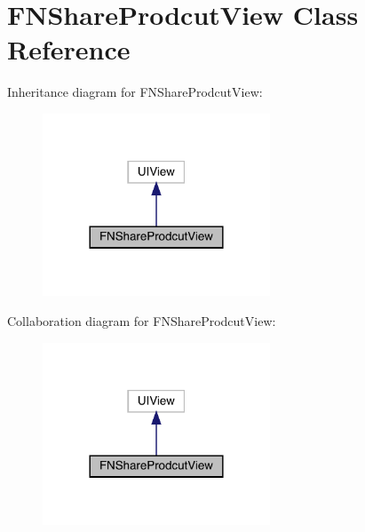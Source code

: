 \hypertarget{interface_f_n_share_prodcut_view}{}\section{F\+N\+Share\+Prodcut\+View Class Reference}
\label{interface_f_n_share_prodcut_view}


Inheritance diagram for F\+N\+Share\+Prodcut\+View\+:\nopagebreak
\begin{figure}[H]
\begin{center}
\leavevmode
\includegraphics[width=192pt]{interface_f_n_share_prodcut_view__inherit__graph}
\end{center}
\end{figure}


Collaboration diagram for F\+N\+Share\+Prodcut\+View\+:\nopagebreak
\begin{figure}[H]
\begin{center}
\leavevmode
\includegraphics[width=192pt]{interface_f_n_share_prodcut_view__coll__graph}
\end{center}
\end{figure}
